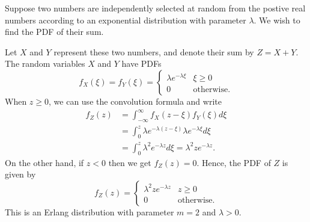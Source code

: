 \begin{example}
Suppose two numbers are independently selected at random from the postive real numbers according to an exponential distribution with parameter $\lambda$. 
We wish to find the PDF of their sum.

Let $X$ and $Y$ represent these two numbers, and denote their sum by $Z = X + Y$.
The random variables $X$ and $Y$ have PDFs
\begin{equation*}
f_X (\xi) = f_Y (\xi) = \begin{cases} \lambda e^{-\lambda \xi} & \xi \geq 0 \\
0 & \text{otherwise} . \end{cases}
\end{equation*}
When $z \geq 0$, we can use the convolution formula and write
\begin{equation*}
\begin{split}
f_Z (z) &= \int_{-\infty}^{\infty} f_X(z - \xi) f_Y(\xi) d\xi \\
&= \int_0^z \lambda e^{-\lambda(z - \xi)} \lambda e^{-\lambda \xi} d\xi \\
&= \int_0^z \lambda^2 e^{-\lambda z} d\xi
= \lambda^2 z e^{-\lambda z}.
\end{split}
\end{equation*}
On the other hand, if $z < 0$ then we get $f_Z(z) = 0$.
Hence, the PDF of $Z$ is given by
\begin{equation*}
f_Z (z) = \begin{cases} \lambda^2 z e^{-\lambda z} & z \geq 0 \\
0 & \text{otherwise} . \end{cases}
\end{equation*}
This is an Erlang distribution with parameter $m = 2$ and $\lambda > 0$.
\end{example}

